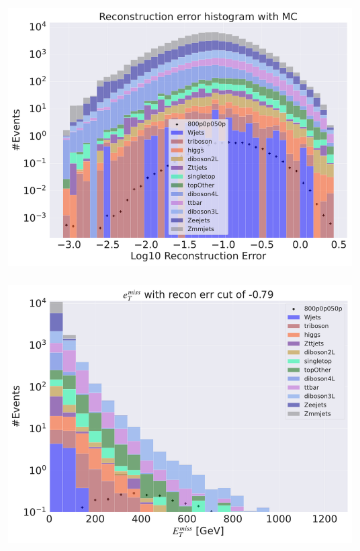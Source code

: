 \begin{figure}[H]
    \centering
    \begin{subfigure}{.40\textwidth}
        \includegraphics[width=\textwidth]{Figures/VAE_testing/big/3lep/b_data_recon_big_rm3_feats_sig_800p0p050p.pdf}
        \caption{ }
        \label{fig:VAE_3lep_big_800_2}
    \end{subfigure}
    \hfill
    \begin{subfigure}{.40\textwidth}
        \includegraphics[width=\textwidth]{Figures/VAE_testing/big/3lep/b_data_recon_big_rm3_feats_sig_800p0p050p_etmiss_recon_errcut_-0.79.pdf}
        \caption{}
        \label{fig:VAE_3lep_big_etmiss_800_2}
    \end{subfigure}

\end{figure}
